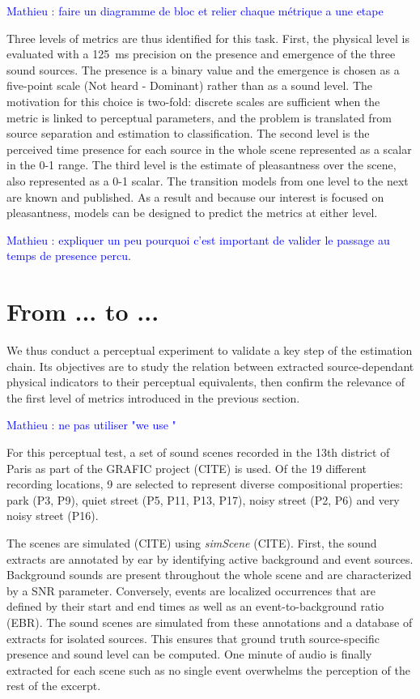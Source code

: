 \documentclass{article}
\newcommand{\ml}[1]{\textcolor{blue}{ Mathieu : #1}}
\begin{document}
\begin{sloppy}
\ml{faire un diagramme de bloc et relier chaque métrique a une etape}

Three levels of metrics are thus identified for this task. First, the physical level is evaluated with a 125~ms precision on the presence and emergence of the three sound sources. The presence is a binary value and the emergence is chosen as a five-point scale (Not heard - Dominant) rather than as a sound level. The motivation for this choice is two-fold: discrete scales are sufficient when the metric is linked to perceptual parameters, and the problem is translated from source separation and estimation to classification. The second level is the perceived time presence for each source in the whole scene represented as a scalar in the 0-1 range. The third level is the estimate of pleasantness over the scene, also represented as a 0-1 scalar. The transition models from one level to the next are known and published. As a result and because our interest is focused on pleasantness, models can be designed to predict the metrics at either level.

\ml{expliquer un peu pourquoi c'est important de valider le passage au temps de presence percu}.

\section{From ... to ...}
\label{sec:val}

We thus conduct a perceptual experiment to validate a key step  of the estimation chain. Its objectives are to study the relation between extracted source-dependant physical indicators to their perceptual equivalents, then confirm the relevance of the first level of metrics introduced in the previous section.

\ml{ne pas utiliser "we use "}

For this perceptual test, a set of sound scenes recorded in the 13th district of Paris as part of the GRAFIC project (CITE) is used. Of the 19 different recording locations, 9 are selected to represent diverse compositional properties: park (P3, P9), quiet street (P5, P11, P13, P17), noisy street (P2, P6) and very noisy street (P16).

The scenes are simulated (CITE) using \textit{simScene} (CITE). First, the sound extracts are annotated by ear by identifying active background and event sources. Background sounds are present throughout the whole scene and are characterized by a SNR parameter. Conversely, events are localized occurrences that are defined by their start and end times as well as an event-to-background ratio (EBR). The sound scenes are simulated from these annotations and a database of extracts for isolated sources. This ensures that ground truth source-specific presence and sound level can be computed. One minute of audio is finally extracted for each scene such as no single event overwhelms the perception of the rest of the excerpt.


\end{sloppy}
\end{document}
